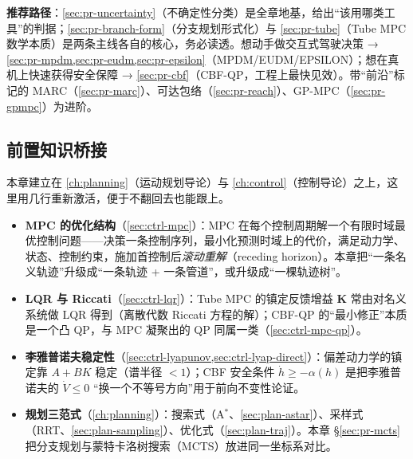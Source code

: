 \noindent\textbf{推荐路径}：\cref{sec:pr-uncertainty}（不确定性分类）是全章地基，给出“该用哪类工具”的判据；\cref{sec:pr-branch-form}（分支规划形式化）与 \cref{sec:pr-tube}（Tube MPC 数学本质）是两条主线各自的核心，务必读透。想动手做交互式驾驶决策 → \cref{sec:pr-mpdm,sec:pr-eudm,sec:pr-epsilon}（MPDM/EUDM/EPSILON）；想在真机上快速获得安全保障 → \cref{sec:pr-cbf}（CBF-QP，工程上最快见效）。带“前沿”标记的 MARC（\cref{sec:pr-marc}）、可达包络（\cref{sec:pr-reach}）、GP-MPC（\cref{sec:pr-gpmpc}）为进阶。

\subsection*{前置知识桥接}
本章建立在 \cref{ch:planning}（运动规划导论）与 \cref{ch:control}（控制导论）之上，这里用几行重新激活，便于不翻回去也能跟上。
\begin{itemize}
  \item \textbf{MPC 的优化结构}（\cref{sec:ctrl-mpc}）：MPC 在每个控制周期解一个有限时域最优控制问题——决策一条控制序列，最小化预测时域上的代价，满足动力学、状态、控制约束，施加首控制后\emph{滚动重解}（receding horizon）。本章把“一条名义轨迹”升级成“一条轨迹 + 一条管道”，或升级成“一棵轨迹树”。
  \item \textbf{LQR 与 Riccati}（\cref{sec:ctrl-lqr}）：Tube MPC 的镇定反馈增益 $\mathbf{K}$ 常由对名义系统做 LQR 得到（离散代数 Riccati 方程的解）；CBF-QP 的“最小修正”本质是一个凸 QP，与 MPC 凝聚出的 QP 同属一类（\cref{sec:ctrl-mpc-qp}）。
  \item \textbf{李雅普诺夫稳定性}（\cref{sec:ctrl-lyapunov,sec:ctrl-lyap-direct}）：偏差动力学的镇定靠 $A+BK$ 稳定（谱半径 $<1$）；CBF 安全条件 $\dot h\ge-\alpha(h)$ 是把李雅普诺夫的 $\dot V\le 0$ “换一个不等号方向”用于前向不变性论证。
  \item \textbf{规划三范式}（\cref{ch:planning}）：搜索式（A$^*$、\cref{sec:plan-astar}）、采样式（RRT、\cref{sec:plan-sampling}）、优化式（\cref{sec:plan-traj}）。本章 §\ref{sec:pr-mcts} 把分支规划与蒙特卡洛树搜索（MCTS）放进同一坐标系对比。
\end{itemize}

